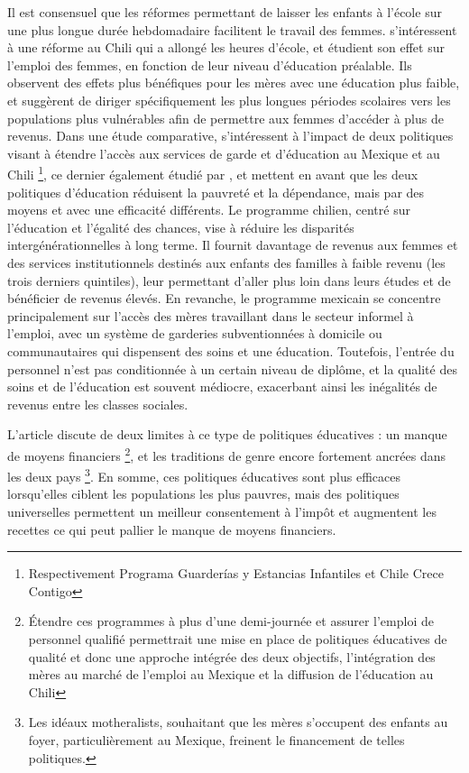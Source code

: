 \documentclass[pagesize, twoside=off, bibliography=totoc, DIV=calc, fontsize=12pt, a4paper, french]{scrartcl}
\begin{document}
Il est consensuel que les réformes permettant de laisser les enfants à l’école sur une plus longue durée hebdomadaire facilitent le travail des femmes.  s’intéressent à une réforme au Chili qui a allongé les heures d’école, et étudient son effet sur l’emploi des femmes, en fonction de leur niveau d’éducation préalable. Ils observent des effets plus bénéfiques pour les mères avec une éducation plus faible, et suggèrent de diriger spécifiquement les plus longues périodes scolaires vers les populations plus vulnérables afin de permettre aux femmes d’accéder à plus de revenus. Dans une étude comparative, \citet{staab_putting_2011} s’intéressent à l’impact de deux politiques visant à étendre l’accès aux services de garde et d’éducation au Mexique et au Chili \footnote{Respectivement  Programa Guarderías y Estancias Infantiles et Chile Crece Contigo}, ce dernier également étudié par \citet{berthelon}, et mettent en avant que les deux politiques d’éducation réduisent la pauvreté et la dépendance, mais par des moyens et avec une efficacité différents. Le programme chilien, centré sur l’éducation et l’égalité des chances, vise à réduire les disparités intergénérationnelles à long terme. Il fournit davantage de revenus aux femmes et des services institutionnels destinés aux enfants des familles à faible revenu (les trois derniers quintiles), leur permettant d’aller plus loin dans leurs études et de bénéficier de revenus élevés. En revanche, le programme mexicain se concentre principalement sur l’accès des mères travaillant dans le secteur informel à l’emploi, avec un système de garderies subventionnées à domicile ou communautaires qui dispensent des soins et une éducation. Toutefois, l’entrée du personnel n’est pas conditionnée à un certain niveau de diplôme, et la qualité des soins et de l’éducation est souvent médiocre, exacerbant ainsi les inégalités de revenus entre les classes sociales.

L’article discute de deux limites à ce type de politiques éducatives : un manque de moyens financiers \footnote{Étendre ces programmes à plus d’une demi-journée et assurer l’emploi de personnel qualifié permettrait une mise en place de politiques éducatives de qualité et donc une approche intégrée des deux objectifs, l’intégration des mères au marché de l’emploi au Mexique et la diffusion de l’éducation au Chili}, et les traditions de genre encore fortement ancrées dans les deux pays \footnote{Les idéaux motheralists, souhaitant que les mères s’occupent des enfants au foyer, particulièrement au Mexique, freinent le financement de telles politiques.}. En somme, ces politiques éducatives sont plus efficaces lorsqu’elles ciblent les populations les plus pauvres, mais des politiques universelles permettent un meilleur consentement à l’impôt et augmentent les recettes ce qui peut pallier le manque de moyens financiers.
\end{document}
